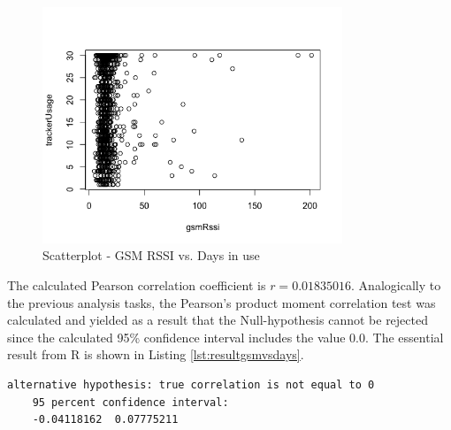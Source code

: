\begin{enumerate}
	\begin{figure}
		\centering
		\includegraphics[width=0.8\textwidth]{img/gsmRssiVsTrackerUsagePlot.png}
		\caption{Scatterplot - GSM RSSI vs. Days in use}
		\label{fig:gsmRssiVsDaysInUse}
	\end{figure} 
	
	The calculated Pearson correlation coefficient is $r = 0.01835016$. 
	Analogically to the previous analysis tasks, the Pearson's product moment correlation test was calculated and yielded as a result that the Null-hypothesis cannot be rejected since the calculated 95\% confidence interval includes the value $0.0$. The essential result from R is shown in Listing \ref{lst:resultgsmvsdays}.
	
	\begin{lstlisting}[caption={Result from Pearson's product moment correlation test}, label={lst:resultgsmvsdays}]
	alternative hypothesis: true correlation is not equal to 0
	95 percent confidence interval:
	-0.04118162  0.07775211
	\end{lstlisting}
	
\end{enumerate}

